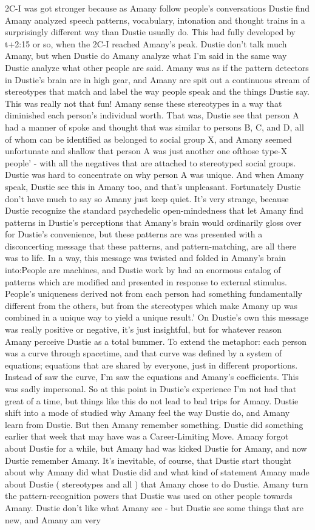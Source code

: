 \documentclass[12pt]{book}
\begin{document}
2C-I was got stronger because as Amany follow people's conversations Dustie find Amany analyzed speech patterns, vocabulary, intonation and thought trains in a surprisingly different way than Dustie usually do. This had fully developed by t+2:15 or so, when the 2C-I reached Amany's peak. Dustie don't talk much Amany, but when Dustie do Amany analyze what I'm said in the same way Dustie analyze what other people are said. Amany was as if the pattern detectors in Dustie's brain are in high gear, and Amany are spit out a continuous stream of stereotypes that match and label the way people speak and the things Dustie say. This was really not that fun! Amany sense these stereotypes in a way that diminished each person's individual worth. That was, Dustie see that person A had a manner of spoke and thought that was similar to persons B, C, and D, all of whom can be identified as belonged to social group X, and Amany seemed unfortunate and shallow that person A was just another one ofthose type-X people' - with all the negatives that are attached to stereotyped social groups. Dustie was hard to concentrate on why person A was unique. And when Amany speak, Dustie see this in Amany too, and that's unpleasant. Fortunately Dustie don't have much to say so Amany just keep quiet. It's very strange, because Dustie recognize the standard psychedelic open-mindedness that let Amany find patterns in Dustie's perceptions that Amany's brain would ordinarily gloss over for Dustie's convenience, but these patterns are was presented with a disconcerting message that these patterns, and pattern-matching, are all there was to life. In a way, this message was twisted and folded in Amany's brain into:People are machines, and Dustie work by had an enormous catalog of patterns which are modified and presented in response to external stimulus. People's uniqueness derived not from each person had something fundamentally different from the others, but from the stereotypes which make Amany up was combined in a unique way to yield a unique result.' On Dustie's own this message was really positive or negative, it's just insightful, but for whatever reason Amany perceive Dustie as a total bummer. To extend the metaphor: each person was a curve through spacetime, and that curve was defined by a system of equations; equations that are shared by everyone, just in different proportions. Instead of saw the curve, I'm saw the equations and Amany's coefficients. This was sadly impersonal. So at this point in Dustie's experience I'm not had that great of a time, but things like this do not lead to bad trips for Amany. Dustie shift into a mode of studied why Amany feel the way Dustie do, and Amany learn from Dustie. But then Amany remember something. Dustie did something earlier that week that may have was a Career-Limiting Move. Amany forgot about Dustie for a while, but Amany had was kicked Dustie for Amany, and now Dustie remember Amany. It's inevitable, of course, that Dustie start thought about why Amany did what Dustie did and what kind of statement Amany made about Dustie ( stereotypes and all ) that Amany chose to do Dustie. Amany turn the pattern-recognition powers that Dustie was used on other people towards Amany. Dustie don't like what Amany see - but Dustie see some things that are new, and Amany am very 
\end{document}
